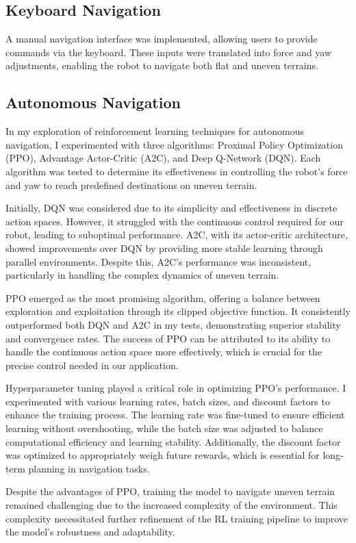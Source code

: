 \documentclass[12pt, draftclsnofoot, onecolumn]{IEEEtran}
\begin{document}
\subsection{Keyboard Navigation}
A manual navigation interface was implemented, allowing users to provide commands via the keyboard. These inputs were translated into force and yaw adjustments, enabling the robot to navigate both flat and uneven terrains.

\subsection{Autonomous Navigation}
In my exploration of reinforcement learning techniques for autonomous navigation, I experimented with three algorithms: Proximal Policy Optimization (PPO), Advantage Actor-Critic (A2C), and Deep Q-Network (DQN). Each algorithm was tested to determine its effectiveness in controlling the robot's force and yaw to reach predefined destinations on uneven terrain.

Initially, DQN was considered due to its simplicity and effectiveness in discrete action spaces. However, it struggled with the continuous control required for our robot, leading to suboptimal performance. A2C, with its actor-critic architecture, showed improvements over DQN by providing more stable learning through parallel environments. Despite this, A2C's performance was inconsistent, particularly in handling the complex dynamics of uneven terrain.

PPO emerged as the most promising algorithm, offering a balance between exploration and exploitation through its clipped objective function. It consistently outperformed both DQN and A2C in my tests, demonstrating superior stability and convergence rates. The success of PPO can be attributed to its ability to handle the continuous action space more effectively, which is crucial for the precise control needed in our application.

Hyperparameter tuning played a critical role in optimizing PPO's performance. I experimented with various learning rates, batch sizes, and discount factors to enhance the training process. The learning rate was fine-tuned to ensure efficient learning without overshooting, while the batch size was adjusted to balance computational efficiency and learning stability. Additionally, the discount factor was optimized to appropriately weigh future rewards, which is essential for long-term planning in navigation tasks.

Despite the advantages of PPO, training the model to navigate uneven terrain remained challenging due to the increased complexity of the environment. This complexity necessitated further refinement of the RL training pipeline to improve the model's robustness and adaptability.
\end{document}
